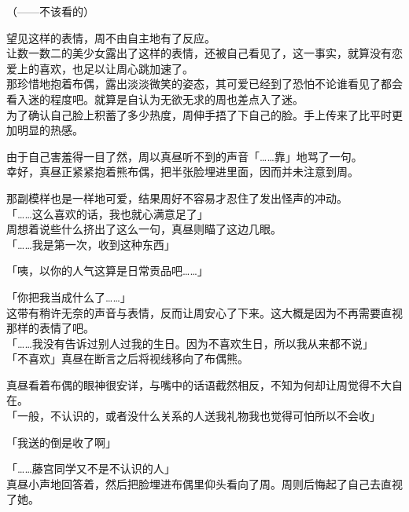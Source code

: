 （——不该看的）

望见这样的表情，周不由自主地有了反应。\\

让数一数二的美少女露出了这样的表情，还被自己看见了，这一事实，就算没有恋爱上的喜欢，也足以让周心跳加速了。\\

那珍惜地抱着布偶，露出淡淡微笑的姿态，其可爱已经到了恐怕不论谁看见了都会看入迷的程度吧。就算是自认为无欲无求的周也差点入了迷。\\

为了确认自己脸上积蓄了多少热度，周伸手捂了下自己的脸。手上传来了比平时更加明显的热感。

由于自己害羞得一目了然，周以真昼听不到的声音「……靠」地骂了一句。\\

幸好，真昼正紧紧抱着熊布偶，把半张脸埋进里面，因而并未注意到周。

那副模样也是一样地可爱，结果周好不容易才忍住了发出怪声的冲动。\\

「……这么喜欢的话，我也就心满意足了」\\

周想着说些什么挤出了这么一句，真昼则瞄了这边几眼。\\

「……我是第一次，收到这种东西」

「咦，以你的人气这算是日常贡品吧……」

「你把我当成什么了……」\\

这带有稍许无奈的声音与表情，反而让周安心了下来。这大概是因为不再需要直视那样的表情了吧。\\

「……我没有告诉过别人过我的生日。因为不喜欢生日，所以我从来都不说」\\

「不喜欢」真昼在断言之后将视线移向了布偶熊。

真昼看着布偶的眼神很安详，与嘴中的话语截然相反，不知为何却让周觉得不大自在。\\

「一般，不认识的，或者没什么关系的人送我礼物我也觉得可怕所以不会收」

「我送的倒是收了啊」

「……藤宫同学又不是不认识的人」\\

真昼小声地回答着，然后把脸埋进布偶里仰头看向了周。周则后悔起了自己去直视了她。\\

